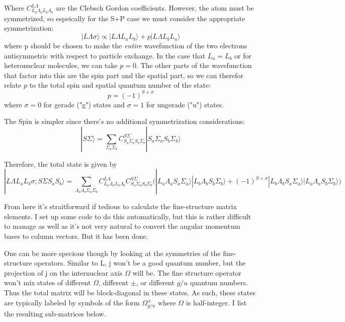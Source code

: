 \documentclass[prl, longbibliography]{revtex4-2}
\begin{document}
Where $C_{L_a \Lambda_a L_b \Lambda_b}^{L \Lambda}$ are the Clebsch Gordon coefficients. However, the atom must be symmetrized, so espeically for the S+P case we must consider the appropriate symmetrization:
\begin{equation}
|L \Lambda \sigma\rangle \propto |L\Lambda L_a L_b\rangle + p |L\Lambda L_b L_a\rangle
\end{equation}
where p should be chosen to make the \emph{entire} wavefunction of the two electrons antisymmetric with respect to particle exchange. In the case that $L_a=L_b$ or for heteronuclear molecules, we can take $p=0$.  The other parts of the wavefunction that factor into this are the spin part and the spatial part, so we can therefor relate $p$ to the total spin and spatial quantum number of the state: 
\begin{equation}
p = (-1)^{S+\sigma}
\end{equation}
where $\sigma=0$ for gerade ("g") states and $\sigma=1$ for ungerade ("u") states.

The Spin is simpler since there's no additional symmetrization considerations:
\begin{equation}
|S \Sigma\rangle = \sum_{\Sigma_a \Sigma_b} C_{S_a \Sigma_a S_b \Sigma_b}^{S \Sigma} |S_a \Sigma_a S_b \Sigma_b\rangle
\end{equation}

Therefore, the total state is given by
\begin{equation}
|L\Lambda L_a L_b \sigma; S\Sigma S_a S_b\rangle = \sum_{\Lambda_a\Lambda_b\Sigma_a\Sigma_b} C_{L_a \Lambda_a L_b \Lambda_b}^{L \Lambda}C_{S_a \Sigma_a S_b \Sigma_b}^{S \Sigma}\big( |L_a\Lambda_a S_a \Sigma_a\rangle|L_b\Lambda_b S_b \Sigma_b\rangle + (-1)^{S+\sigma}|L_b\Lambda_b S_a \Sigma_a\rangle|L_a\Lambda_a S_b \Sigma_b\rangle \big)
\end{equation} 

From here it's straitforward if tedious to calculate the fine-structure matrix elements. I set up some code to do this automatically, but this is rather difficult to manage as well as it's not very natural to convert the angular momentum bases to column vectors. But it has been done.

One can be more specious though by looking at the symmetries of the fine-structure operators. Similar to L, j won't be a good quantum number, but the projection of j on the internuclear axis $\Omega$ will be. The fine structure operator won't mix states of different $\Omega$, different $\pm$, or different $g/u$ quantum numbers. Thus the total matrix will be block-diagonal in these states. As such, these states are typically labeled by symbols of the form $\Omega^{\pm}_{g/u}$ where $\Omega$ is half-integer.  I list the resulting sub-matrices below. 
\end{document}
